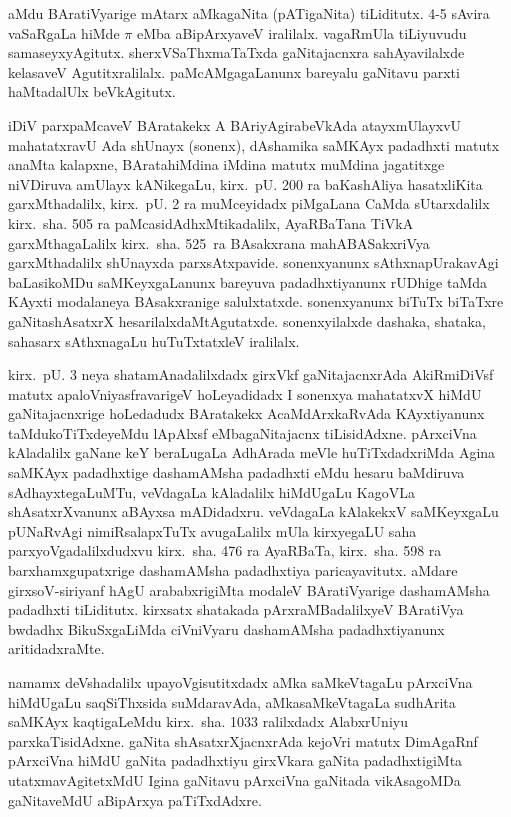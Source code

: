 aMdu BAratiVyarige mAtarx aMkagaNita (pATigaNita) tiLiditutx. {\rm 4-5} sAvira vaSaRgaLa hiMde $\pi$ eMba aBipArxyaveV iralilalx. vagaRmUla tiLiyuvudu samaseyx\-yAgitutx. sherxVSaThxmaTaTxda gaNitajacnxra sahAyavilalxde kelasaveV Agutitxralilalx. paMcAMgagaLanunx bareyalu gaNitavu parxti haMtadalUlx beVkAgitutx.

iDiV parxpaMcaveV BAratakekx A BAriyAgirabeVkAda atayxmUlayxvU mahatatxravU Ada shUnayx (sonenx), dAshamika saMKAyx padadhxti matutx anaMta kalapxne, BArata\break hiMdina iMdina matutx muMdina jagatitxge niVDiruva amUlayx kANikegaLu, kirx.~pU. {\rm 200} ra baKashAliya hasatxliKita garxMthadalilx, kirx.~pU. {\rm 2} ra muMceyidadx piMgaLana CaMda sUtarxdalilx kirx.~sha. {\rm 505} ra paMcasidAdhxMtikadalilx, AyaRBaTana TiVkA garxMthagaLalilx kirx.~sha. {\rm 525}~ra BAsakxrana mahABASakxriVya garxMthadalilx shUnayxda parxsAtxpavide. sonenxyanunx sAthxnapUrakavAgi baLasikoMDu saMKeyxgaLanunx bareyuva padadhxtiyanunx rUDhige taMda KAyxti modalaneya BAsakxranige salulxtatxde. sonenxyanunx biTuTx biTaTxre gaNitashAsatxrX hesarilalx\-daMtAgutatxde. sonenxyilalxde dashaka, shataka, sahasarx sAthxnagaLu huTuTxtatxleV iralilalx. 

kirx.~pU. {\rm 3} neya shatamAnadalilxdadx girxVkf gaNitajacnxrAda AkiRmiDiVsf matutx apaloV\-niyasfravarigeV hoLeyadidadx I sonenxya mahatatxvX hiMdU gaNitajacnxrige hoLedadudx BAratakekx AcaMdArxkaRvAda KAyxtiyanunx taMdukoTiTxdeyeMdu lApAlxsf eMba\break gaNitajacnx tiLisidAdxne. pArxciVna kAladalilx gaNane keY beraLugaLa AdhArada meVle huTiTxdadx\-riMda Agina saMKAyx padadhxtige dashamAMsha padadhxti eMdu hesaru baMdiruva sAdhayxtegaLuMTu, veVdagaLa kAladalilx hiMdUgaLu KagoVLa shAsatxrXvanunx aBAyxsa mADidadxru. veVdagaLa kAlakekxV saMKeyxgaLu pUNaRvAgi nimiRsalapxTuTx avugaLalilx mUla kirxyegaLU saha parxyoVgadalilxdudxvu kirx.~sha. {\rm 476} ra AyaRBaTa, kirx.~sha. {\rm 598} ra barxhamxgupatxrige dashamAMsha padadhxtiya paricayavitutx. aMdare girxsoV-siriyanf hAgU arababxrigiMta modaleV BAratiVyarige dashamAMsha padadhxti tiLiditutx. kirxsatx shatakada pArxraMBadalilxyeV BAratiVya bwdadhx BikuSxgaLiMda ciVniVyaru dashamAMsha padadhxtiyanunx aritidadxraMte.

namamx deVshadalilx upayoVgisutitxdadx aMka saMkeVtagaLu pArxciVna hiMdUgaLu saqSiThx\-sida suMdaravAda, aMkasaMkeVtagaLa sudhArita saMKAyx kaqtigaLeMdu kirx.~sha. {\rm 1033} ralilxdadx AlabxrUniyu parxkaTisidAdxne. gaNita shAsatxrXjacnxrAda kejoVri matutx DimAgaRnf pArxciVna hiMdU gaNita padadhxtiyu girxVkara gaNita padadhxtigiMta utatxmavAgitetxMdU Igina gaNitavu pArxciVna gaNitada vikAsagoMDa gaNitaveMdU aBipArxya paTiTxdAdxre.

